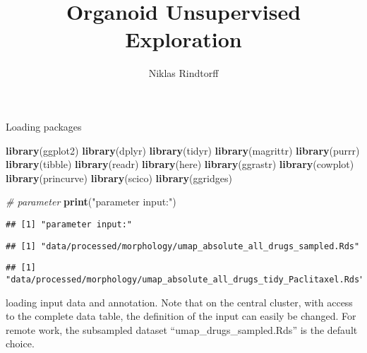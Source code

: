 \documentclass[
]{article}
\title{Organoid Unsupervised Exploration}
\author{Niklas Rindtorff}
\date{}
\newenvironment{Shaded}{\begin{snugshade}}{\end{snugshade}}
\newcommand{\CommentTok}[1]{\textcolor[rgb]{0.56,0.35,0.01}{\textit{#1}}}
\newcommand{\KeywordTok}[1]{\textcolor[rgb]{0.13,0.29,0.53}{\textbf{#1}}}
\newcommand{\NormalTok}[1]{#1}
\newcommand{\OperatorTok}[1]{\textcolor[rgb]{0.81,0.36,0.00}{\textbf{#1}}}
\newcommand{\StringTok}[1]{\textcolor[rgb]{0.31,0.60,0.02}{#1}}
\begin{document}
\maketitle

Loading packages

\begin{Shaded}
\begin{Highlighting}[]
\KeywordTok{library}\NormalTok{(ggplot2)}
\KeywordTok{library}\NormalTok{(dplyr)}
\KeywordTok{library}\NormalTok{(tidyr)}
\KeywordTok{library}\NormalTok{(magrittr)}
\KeywordTok{library}\NormalTok{(purrr)}
\KeywordTok{library}\NormalTok{(tibble)}
\KeywordTok{library}\NormalTok{(readr)}
\KeywordTok{library}\NormalTok{(here)}
\KeywordTok{library}\NormalTok{(ggrastr)}
\KeywordTok{library}\NormalTok{(cowplot)}
\KeywordTok{library}\NormalTok{(princurve)}
\KeywordTok{library}\NormalTok{(scico)}
\KeywordTok{library}\NormalTok{(ggridges)}

\CommentTok{# parameter}
\KeywordTok{print}\NormalTok{(}\StringTok{"parameter input:"}\NormalTok{)}
\end{Highlighting}
\end{Shaded}

\begin{verbatim}
## [1] "parameter input:"
\end{verbatim}

\begin{Shaded}
\end{Shaded}

\begin{verbatim}
## [1] "data/processed/morphology/umap_absolute_all_drugs_sampled.Rds"
\end{verbatim}

\begin{Shaded}
\end{Shaded}

\begin{verbatim}
## [1] "data/processed/morphology/umap_absolute_all_drugs_tidy_Paclitaxel.Rds"
\end{verbatim}

loading input data and annotation. Note that on the central cluster,
with access to the complete data table, the definition of the input can
easily be changed. For remote work, the subsampled dataset
``umap\_drugs\_sampled.Rds'' is the default choice.
\end{document}
